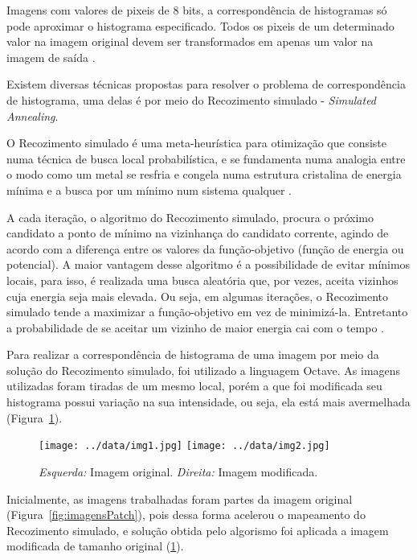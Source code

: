 Imagens com valores de pixeis de 8 bits, a correspondência de histogramas só pode aproximar o histograma especificado. Todos os pixeis de um determinado valor na imagem original devem ser transformados em apenas um valor na imagem de saída \cite{wiki}.

Existem diversas técnicas propostas para resolver o problema de correspondência de histograma, uma delas é por meio do Recozimento simulado - \textit{Simulated Annealing}.


O Recozimento simulado é uma meta-heurística para otimização que consiste numa técnica de busca local probabilística, e se fundamenta numa analogia entre o modo como um metal se resfria e congela numa estrutura cristalina de energia mínima e a busca por um mínimo num sistema qualquer \cite{simulated}. 

A cada iteração, o algoritmo do Recozimento simulado, procura o próximo candidato a ponto de mínimo na vizinhança do candidato corrente, agindo de acordo com a diferença entre os valores da função-objetivo (função de energia ou potencial). A maior vantagem desse algoritmo é a possibilidade de evitar mínimos locais, para isso, é realizada uma busca aleatória que, por vezes, aceita vizinhos cuja energia seja mais elevada. Ou seja, em algumas iterações, o Recozimento simulado tende a maximizar a função-objetivo em vez de minimizá-la. Entretanto a probabilidade de se aceitar um vizinho de maior energia cai com o tempo \cite{simulated}.


Para realizar a correspondência de histograma de uma imagem por meio da solução do Recozimento simulado, foi utilizado a linguagem Octave. As imagens utilizadas foram tiradas de um mesmo local, porém a que foi modificada seu histograma possui variação na sua intensidade, ou seja, ela está mais avermelhada (Figura~\ref{fig:imagens}).

\begin{figure}[h]
    \centering
    \texttt{[image: ../data/img1.jpg]}
    \texttt{[image: ../data/img2.jpg]}
    \caption{\emph{Esquerda:} Imagem original. \emph{Direita:} Imagem modificada.}
    \label{fig:imagens}
\end{figure}

Inicialmente, as imagens trabalhadas foram partes da imagem original (Figura~\ref{fig:imagensPatch}), pois dessa forma acelerou o mapeamento do Recozimento simulado, e solução obtida pelo algorismo foi aplicada a imagem modificada de tamanho original (\ref{fig:imagens}). 

